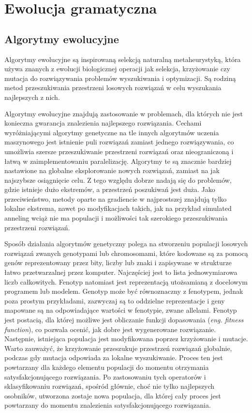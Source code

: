 
\section{Ewolucja gramatyczna}
\label{sec:ewolucjaGramatyczna}
\subsection{Algorytmy ewolucyjne}
Algorytmy ewolucyjne \cite{EA} są inspirowaną selekcją naturalną metaheurystyką, która używa znanych z ewolucji biologicznej operacji jak selekcja, krzyżowanie czy mutacja do rozwiązywania problemów wyszukiwania i optymizacji. Są rodziną metod przeszukiwania przestrzeni losowych rozwiązań w celu wyszukania najlepszych z nich. 

Algorytmy ewolucyjne znajdują zastosowanie w problemach, dla których nie jest konieczna gwarancja znalezienia najlepszego rozwiązania. Cechami wyróżniającymi algorytmy genetyczne na tle innych algorytmów uczenia maszynowego jest istnienie puli rozwiązań zamiast jednego rozwiązywania, co umożliwia szersze przeszukiwanie przestrzeni rozwiązań oraz nieograniczoną i łatwą w zaimplementowaniu paralelizację. Algorytmy te są znacznie bardziej nastawione na globalne eksplorowanie nowych rozwiązań, zamiast na jak najszybsze osiągnięcie celu. Z tego względu dobrze nadają się do problemów, gdzie istnieje dużo ekstremów, a przestrzeń poszukiwań jest duża. Jako przeciwieństwo, metody oparte na gradiencie w najprostszej znajdują tylko lokalne ekstrema, nawet po modyfikacjach takich, jak na przykład simulated anneling wciąż nie ma populacji i możliwości tak szerokiego przeszukiwania przestrzeni rozwiązań.

Sposób działania algorytmów genetyczny polega na stworzeniu populacji losowych rozwiązań zwanych genotypami lub chromosomami, które kodowane są za pomocą genów reprezentowany przez bity, liczby lub znaki i zapisywane w strukturze łatwo przetwarzalnej przez komputer. Najczęściej jest to lista jednowymiarowa liczb całkowitych. Fenotyp natomiast jest reprezentacją utożsamianą z docelowym programem lub modelem. Genotyp może być równoznaczny z fenotypem, jednak poza prostym przykładami, zazwyczaj są to oddzielne reprezentacje i geny mapowane są na odpowiadające wartości w fenotypie, zwane allelami. Fenotyp jest postacią, dla której możliwe jest obliczanie funkcji dopasowania (\textit{eng. fitness function}), co pozwala ocenić, jak dobre jest wygenerowane rozwiązanie. Następnie, istniejąca populacja jest modyfikowana poprzez krzyżowanie i mutacje. Warto zauważyć, że krzyżowanie przeszukuje przestrzeń rozwiązań globalnie, podczas gdy mutacja odpowiada za lokalne wyszukiwanie. Proces ten jest powtarzany dla każdego elementu populacji do momentu otrzymania satysfakcjonującego rozwiązania. Po zastosowaniu tych operatorów i sklasyfikowaniu rozwiązań, spośród głównie, choć nie tylko najlepszych osobników, utworzona zostaje nowa populacja, dla której cały proces jest powtarzany do momentu znalezienia satysfakcjonującego rozwiązania.

